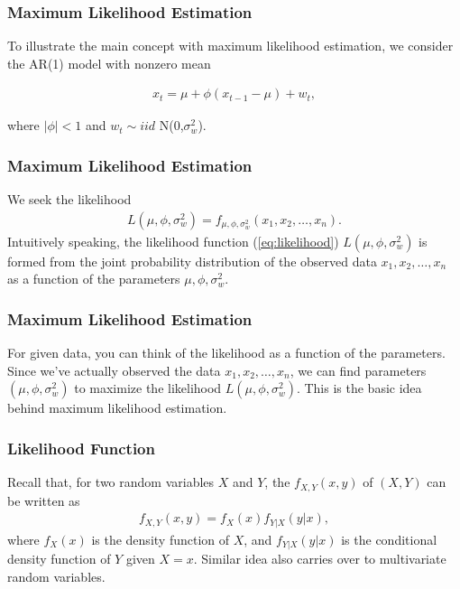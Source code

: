 \documentclass[%
xcolor=pdftex]{beamer}
\begin{document}
\begin{frame}
\frametitle{Maximum Likelihood Estimation}

To illustrate the main concept with maximum likelihood estimation, we consider the AR(1) model with nonzero mean

\begin{eqnarray}\label{eq:ar1}
x_t=\mu+\phi(x_{t-1}-\mu)+w_t,
\end{eqnarray}

where $|\phi|<1$ and $w_t\sim iid $ N(0,$\sigma^2_w$).

\end{frame}

\begin{frame}
\frametitle{Maximum Likelihood Estimation}

We seek the likelihood
\begin{eqnarray}\label{eq:likelihood}
L(\mu,\phi,\sigma^2_w) = f_{\mu,\phi,\sigma^2_w}(x_1,x_2,\ldots,x_n).
\end{eqnarray}
Intuitively speaking, the likelihood function (\ref{eq:likelihood})
$L(\mu,\phi,\sigma^2_w)$ is formed from the joint probability distribution of the observed data $x_1,x_2,\ldots,x_n$ as a function of the parameters $\mu,\phi,\sigma^2_w$.

\end{frame}

\begin{frame}
\frametitle{Maximum Likelihood Estimation}

For given data, you can
think of the likelihood as a function of the parameters.
Since we've actually observed the data $x_1,x_2,\ldots,x_n$, we
can find parameters $(\mu,\phi,\sigma^2_w)$ to maximize the
likelihood $L(\mu,\phi,\sigma^2_w)$. This is the basic idea
behind maximum likelihood estimation.

\end{frame}


\begin{frame}
\frametitle{Likelihood Function}

Recall that, for two random variables $X$
and $Y$, the \underline{\hspace{20 mm}} $f_{X,Y}(x,y)$ of $(X,Y)$ can be
written as
\begin{eqnarray*}
f_{X,Y}(x,y)=f_X(x) f_{Y|X}(y|x),
\end{eqnarray*}
where $f_X(x)$ is the density function of $X$, and
$f_{Y|X}(y|x)$ is the conditional density function of $Y$ given
$X=x$. Similar idea also carries over to multivariate random
variables.

\end{frame}
\end{document}
